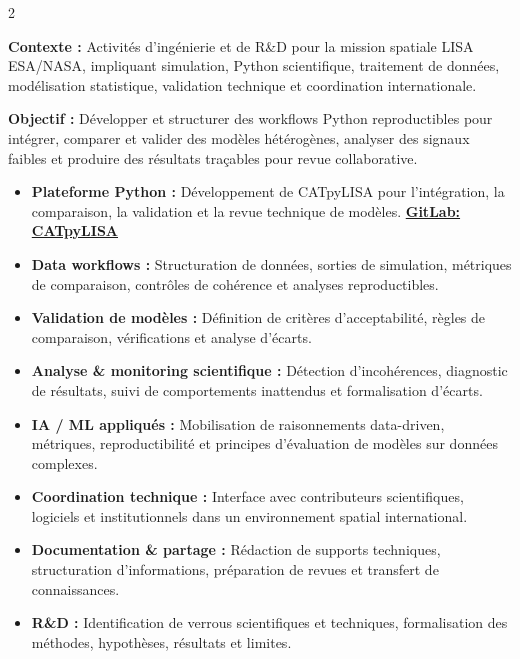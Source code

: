 \documentclass[8pt,a4paper,ragged2e,withhyper]{altacv}
\begin{document}
\begin{paracol}{2}
\divider


\textbf{Contexte :} Activités d’ingénierie et de R\&D pour la mission spatiale LISA ESA/NASA, impliquant simulation, Python scientifique, traitement de données, modélisation statistique, validation technique et coordination internationale.

\textbf{Objectif :} Développer et structurer des workflows Python reproductibles pour intégrer, comparer et valider des modèles hétérogènes, analyser des signaux faibles et produire des résultats traçables pour revue collaborative.

\begin{itemize}
  \item \textbf{Plateforme Python :} Développement de CATpyLISA pour l’intégration, la comparaison, la validation et la revue technique de modèles.
  \textcolor{DarkPastelRed}{\href{https://gitlab.oca.eu/gboileau/lisa_l3_tools}{\bf GitLab: CATpyLISA}}
  \item \textbf{Data workflows :} Structuration de données, sorties de simulation, métriques de comparaison, contrôles de cohérence et analyses reproductibles.
  \item \textbf{Validation de modèles :} Définition de critères d’acceptabilité, règles de comparaison, vérifications et analyse d’écarts.
  \item \textbf{Analyse \& monitoring scientifique :} Détection d’incohérences, diagnostic de résultats, suivi de comportements inattendus et formalisation d’écarts.
  \item \textbf{IA / ML appliqués :} Mobilisation de raisonnements data-driven, métriques, reproductibilité et principes d’évaluation de modèles sur données complexes.
  \item \textbf{Coordination technique :} Interface avec contributeurs scientifiques, logiciels et institutionnels dans un environnement spatial international.
  \item \textbf{Documentation \& partage :} Rédaction de supports techniques, structuration d’informations, préparation de revues et transfert de connaissances.
  \item \textbf{R\&D :} Identification de verrous scientifiques et techniques, formalisation des méthodes, hypothèses, résultats et limites.
\end{itemize}

\divider


\end{paracol}
\end{document}
